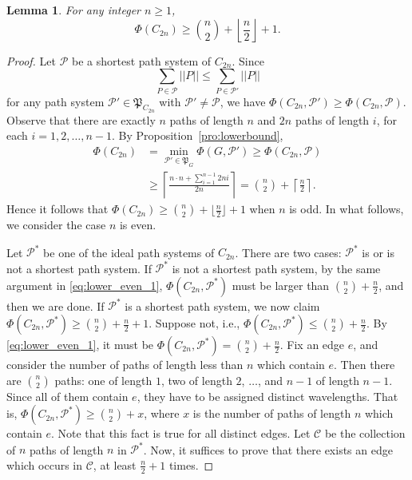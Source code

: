 \documentclass[journal,draftcls,onecolumn,12pt,twoside]{IEEEtran}
\newtheorem{lemma}[theorem]{\bf Lemma}
\begin{document}
\begin{lemma}\label{lemma:cycle_even_lower}
For any integer $n\geq 1$, $$\Phi(C_{2n})\geq {n\choose 2} + \left\lfloor\frac{n}{2}\right\rfloor +1.$$
\end{lemma}
\begin{proof}
Let $\mathcal{P}$ be a shortest path system of $C_{2n}$.
Since $$\sum_{P\in\mathcal{P}}||P|| \leq \sum_{P\in\mathcal{P'}}||P||$$ for any path system $\mathcal{P'}\in\mathfrak{P}_{C_{2n}}$ with $\mathcal{P'}\neq\mathcal{P}$, we have $\Phi(C_{2n},\mathcal{P}')\geq\Phi(C_{2n},\mathcal{P})$.
Observe that there are exactly $n$ paths of length $n$ and $2n$ paths of length $i$, for each $i=1,2,\ldots,n-1$. 
By Proposition~\ref{pro:lowerbound}, 
\begin{equation}\label{eq:lower_even_1}
\begin{split}
\Phi(C_{2n}) &= \min_{\mathcal{P}'\in\mathfrak{P}_G}\Phi(G,\mathcal{P}') \geq\Phi(C_{2n},\mathcal{P}) \\
&\geq \left\lceil\frac{n\cdot n + \sum_{i=1}^{n-1}2ni}{2n} \right\rceil = {n\choose 2} + \left\lceil\frac{n}{2}\right\rceil. 
\end{split}
\end{equation}
Hence it follows that $\Phi(C_{2n})\geq {n\choose 2} + \lfloor\frac{n}{2}\rfloor +1$ when $n$ is odd.
In what follows, we consider the case $n$ is even.

Let $\mathcal{P}^*$ be one of the ideal path systems of $C_{2n}$.
There are two cases: $\mathcal{P}^*$ is or is not a shortest path system.
If $\mathcal{P}^*$ is not a shortest path system, by the same argument in \eqref{eq:lower_even_1}, $\Phi(C_{2n},\mathcal{P}^*)$ must be larger than ${n\choose 2}+\frac{n}{2}$, and then we are done.
If $\mathcal{P}^*$ is a shortest path system, we now claim $\Phi(C_{2n},\mathcal{P}^*)\geq{n\choose 2}+\frac{n}{2}+1$.
Suppose not, i.e., $\Phi(C_{2n},\mathcal{P}^*)\leq {n\choose 2}+\frac{n}{2}$.
By \eqref{eq:lower_even_1}, it must be $\Phi(C_{2n},\mathcal{P}^*)={n\choose 2}+\frac{n}{2}$.
Fix an edge $e$, and consider the number of paths of length less than $n$ which contain $e$.
Then there are ${n\choose 2}$ paths: one of length $1$, two of length $2$, $\ldots$, and $n-1$ of length $n-1$.
Since all of them contain $e$, they have to be assigned distinct wavelengths.
That is, $\Phi(C_{2n},\mathcal{P}^*)\geq {n\choose 2}+x$, where $x$ is the number of paths of length $n$ which contain $e$.
Note that this fact is true for all distinct edges.
Let $\mathcal{C}$ be the collection of $n$ paths of length $n$ in $\mathcal{P}^*$.
Now, it suffices to prove that there exists an edge which occurs in $\mathcal{C}$, at least $\frac{n}{2}+1$ times.


\end{proof}
\end{document}
